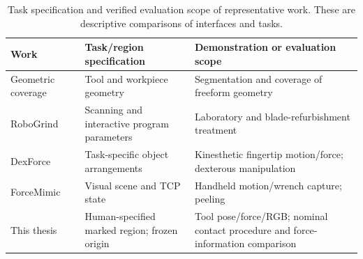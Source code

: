 \begin{table}[tbp]
\centering\footnotesize
\caption[Task specification and evaluation scope]{Task specification and verified evaluation scope of representative work. These are descriptive comparisons of interfaces and tasks.}
\label{tab:related_task_scope}
\begin{tabularx}{\textwidth}{P{0.22\textwidth}XX}
\toprule Work & Task/region specification & Demonstration or evaluation scope \\ \midrule
Geometric coverage~\cite{schneyer2023segmentation} & Tool and workpiece geometry & Segmentation and coverage of freeform geometry \\
RoboGrind~\cite{alt2024robogrind} & Scanning and interactive program parameters & Laboratory and blade-refurbishment treatment \\
DexForce~\cite{chen2025dexforce} & Task-specific object arrangements & Kinesthetic fingertip motion/force; dexterous manipulation \\
ForceMimic~\cite{liu2025forcemimic} & Visual scene and TCP state & Handheld motion/wrench capture; peeling \\
This thesis & Human-specified marked region; frozen origin & Tool pose/force/RGB; nominal contact procedure and force-information comparison \\
\bottomrule
\end{tabularx}
\end{table}
